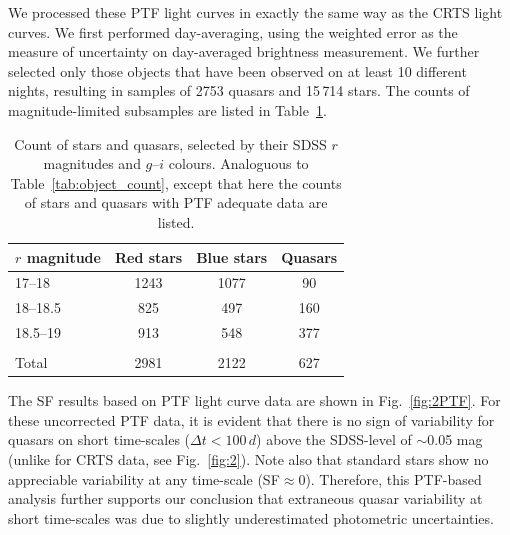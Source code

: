 \documentclass[fleqn,usenatbib]{mnras}
\begin{document}
We processed these PTF light curves in exactly the same way as the CRTS light curves. We first performed day-averaging, 
using the weighted error as the measure of uncertainty on day-averaged brightness measurement. We further selected only 
those objects that have been observed on at least 10 different nights, resulting in samples of 2753 quasars and 15$\,$714 stars. 
The counts of magnitude-limited subsamples are listed in Table~\ref{tab:ptf}. 

\begin{table}
\centering
\begin{threeparttable}
\caption{Count of stars and quasars, selected by their SDSS $r$ magnitudes and $g$--$i$ colours. Analoguous to Table~\ref{tab:object_count}, except that here the counts of stars and quasars with PTF
adequate data are listed.}
\label{tab:ptf}
\begin{tabular}{ l ccc } 
\hline
$r$ magnitude  & Red stars & Blue stars & Quasars \\ 
\hline
17--18   & 1243 & 1077   & 90    \\ 
18--18.5 & 825 &  497  & 160   \\ 
18.5--19 & 913 &  548  & 377   \\
 & & & \\
Total       & 2981 &  2122 & 627  \\
\hline
\end{tabular}
\end{threeparttable}
\end{table}
 
The SF results based on PTF light curve data are shown in Fig.~\ref{fig:2PTF}.  For these uncorrected PTF data, 
it is evident that there is no sign of variability for quasars on short time-scales ($\Delta t < 100 \, d$) 
above the SDSS-level of $\sim$0.05 mag (unlike for CRTS data, see Fig.~\ref{fig:2}). Note also that standard stars 
show no appreciable variability at any time-scale (SF$\approx0$). Therefore, this PTF-based analysis further 
supports our conclusion that extraneous quasar variability at short time-scales was due to slightly underestimated
photometric uncertainties. 
\end{document}

